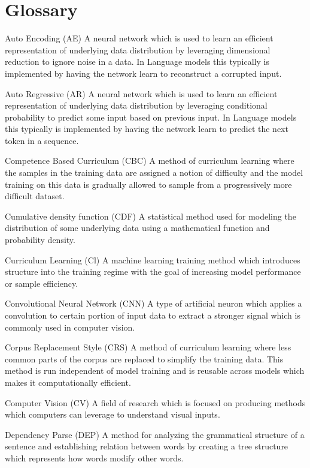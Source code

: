 \documentclass [11pt, proquest] {uwthesis}[2020/12/20]
\begin{document}
\chapter*{Glossary}   
\begin{glossary}
\item[Auto Encoding (AE)] A neural network which is used to learn an efficient representation of underlying data distribution by leveraging dimensional reduction to ignore noise in a data. In Language models this typically is implemented by having the network learn to reconstruct a corrupted input.
\item[Auto Regressive (AR)] A neural network which is used to learn an efficient representation of underlying data distribution by leveraging conditional probability to predict some input based on previous input. In Language models this typically is implemented by having the network learn to predict the next token in a sequence.
\item[Competence Based Curriculum (CBC)] A method of curriculum learning where the samples in the training data are assigned a notion of difficulty and the model training on this data is gradually allowed to sample from a progressively more difficult dataset.
\item[Cumulative density function (CDF)] A statistical method used for modeling the distribution of some underlying data using a mathematical function and probability density.
\item[Curriculum Learning (Cl)] A machine learning training method which introduces structure into the training regime with the goal of increasing model performance or sample efficiency.
\item[Convolutional Neural Network (CNN)] A type of artificial neuron which applies a convolution to certain portion of input data to extract a stronger signal which is commonly used in computer vision.
\item[Corpus Replacement Style (CRS)] A method of curriculum learning where less common parts of the corpus are replaced to simplify the training data. This method is run independent of model training and is reusable across models which makes it computationally efficient.
\item[Computer Vision (CV)] A field of research which is focused on producing methods which computers can leverage to understand visual inputs.
\item[Dependency Parse (DEP)] A method for analyzing the grammatical structure of a sentence and establishing relation between words by creating a tree structure which represents how words modify other words.

\end{glossary}
\end{document}
